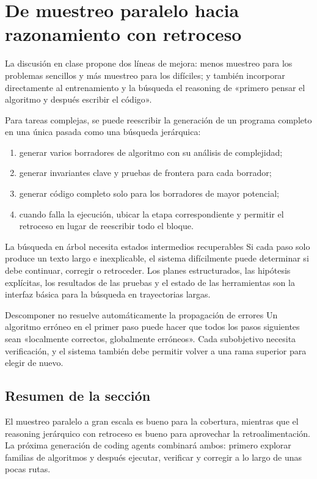 \section{De muestreo paralelo hacia razonamiento con retroceso}

La discusión en clase propone dos líneas de mejora: menos muestreo para los problemas sencillos y más muestreo para los difíciles; y también incorporar directamente al entrenamiento y la búsqueda el reasoning de «primero pensar el algoritmo y después escribir el código».

Para tareas complejas, se puede reescribir la generación de un programa completo en una única pasada como una búsqueda jerárquica:

\begin{enumerate}
    \item generar varios borradores de algoritmo con su análisis de complejidad;
    \item generar invariantes clave y pruebas de frontera para cada borrador;
    \item generar código completo solo para los borradores de mayor potencial;
    \item cuando falla la ejecución, ubicar la etapa correspondiente y permitir el retroceso en lugar de reescribir todo el bloque.
\end{enumerate}

\begin{importantbox}{La búsqueda en árbol necesita estados intermedios recuperables}
Si cada paso solo produce un texto largo e inexplicable, el sistema difícilmente puede determinar si debe continuar, corregir o retroceder. Los planes estructurados, las hipótesis explícitas, los resultados de las pruebas y el estado de las herramientas son la interfaz básica para la búsqueda en trayectorias largas.
\end{importantbox}

\begin{warningbox}{Descomponer no resuelve automáticamente la propagación de errores}
Un algoritmo erróneo en el primer paso puede hacer que todos los pasos siguientes sean «localmente correctos, globalmente erróneos». Cada subobjetivo necesita verificación, y el sistema también debe permitir volver a una rama superior para elegir de nuevo.
\end{warningbox}

\subsection{Resumen de la sección}

El muestreo paralelo a gran escala es bueno para la cobertura, mientras que el reasoning jerárquico con retroceso es bueno para aprovechar la retroalimentación. La próxima generación de coding agents combinará ambos: primero explorar familias de algoritmos y después ejecutar, verificar y corregir a lo largo de unas pocas rutas.
